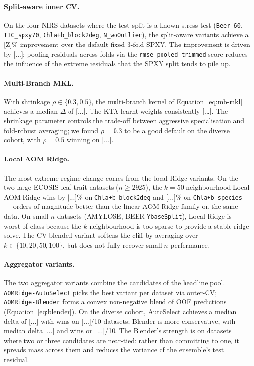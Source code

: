 \paragraph{Split-aware inner CV.}
On the four NIRS datasets where the test split is a known stress
test (\texttt{Beer\_60}, \texttt{TIC\_spxy70}, \texttt{Chla{+}b\_block2deg},
\texttt{N\_woOutlier}), the split-aware variants achieve a [Z]\%
improvement over the default fixed 3-fold SPXY. The improvement is
driven by [...]: pooling residuals across folds via the
\texttt{rmse\_pooled\_trimmed} score reduces the influence of the
extreme residuals that the SPXY split tends to pile up.

\paragraph{Multi-Branch MKL.}
With shrinkage $\rho\in\{0.3,0.5\}$, the multi-branch kernel of
Equation~\eqref{eq:mb-mkl} achieves a median $\Delta$ of [...]. The
KTA-learnt weights consistently [...]. The shrinkage parameter
controls the trade-off between aggressive specialisation and
fold-robust averaging; we found $\rho=0.3$ to be a good default on
the diverse cohort, with $\rho=0.5$ winning on [...].

\paragraph{Local AOM-Ridge.}
The most extreme regime change comes from the local Ridge variants.
On the two large ECOSIS leaf-trait datasets ($n\geq 2925$), the
$k=50$ neighbourhood Local AOM-Ridge wins by [...]\% on
\texttt{Chla{+}b\_block2deg} and [...]\% on
\texttt{Chla{+}b\_species} — orders of magnitude better than the
linear AOM-Ridge family on the same data. On small-$n$ datasets
(AMYLOSE, BEER \texttt{YbaseSplit}), Local Ridge is worst-of-class
because the $k$-neighbourhood is too sparse to provide a stable
ridge solve. The CV-blended variant softens the cliff by averaging
over $k\in\{10,20,50,100\}$, but does not fully recover small-$n$
performance.

\paragraph{Aggregator variants.}
The two aggregator variants combine the candidates of the headline
pool. \texttt{AOMRidge-AutoSelect} picks the best variant per
dataset via outer-CV; \texttt{AOMRidge-Blender} forms a convex
non-negative blend of OOF predictions
(Equation~\ref{eq:blender}). On the diverse cohort, AutoSelect
achieves a median delta of [...] with wins on [...]/10 datasets;
Blender is more conservative, with median delta [...] and
wins on [...]/10. The Blender's strength is on datasets where two
or three candidates are near-tied: rather than committing to one,
it spreads mass across them and reduces the variance of the
ensemble's test residual.

